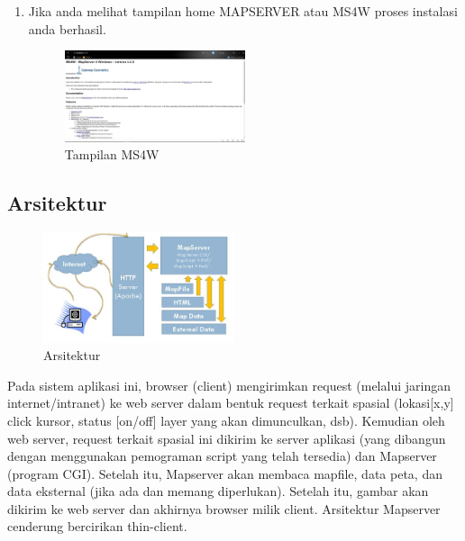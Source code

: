 \begin{enumerate}
\item
Jika anda melihat tampilan home MAPSERVER atau MS4W proses instalasi anda berhasil.
\begin{figure}[ht]
	    \centerline{\includegraphics[width=0.50\textwidth]{figures/gambar4.JPG}}
	    \caption{Tampilan MS4W}
		\label{gambar4}
		\end{figure}
\end{enumerate}


\subsection{Arsitektur}
\begin{figure}[ht]
	    \centerline{\includegraphics[width=0.50\textwidth]{figures/gambar6.JPG}}
	    \caption{Arsitektur}
		\label{gambar6}
		\end{figure}
Pada sistem aplikasi ini, browser (client) mengirimkan request (melalui jaringan internet/intranet) ke web server dalam bentuk request terkait spasial (lokasi[x,y] click kursor, status [on/off] layer yang akan dimunculkan, dsb).
Kemudian oleh web server, request terkait spasial ini dikirim ke server aplikasi (yang dibangun dengan menggunakan pemograman script yang telah tersedia) dan Mapserver (program CGI). Setelah itu, Mapserver akan membaca mapfile, data peta, dan data eksternal (jika ada dan memang diperlukan).
Setelah itu, gambar akan dikirim ke web server dan akhirnya browser milik client. Arsitektur Mapserver cenderung bercirikan thin-client.

